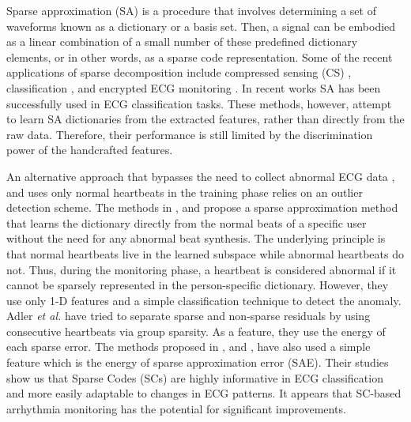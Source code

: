 \documentclass[journal,transmag]{IEEEtran}
\begin{document}
Sparse approximation (SA) is a procedure that involves determining a set of waveforms known as a dictionary or a basis set. Then, a signal can be embodied as a linear combination of a small number of these predefined dictionary elements, or in other words, as a sparse code representation.
Some of the recent applications of sparse decomposition include compressed sensing (CS) \cite{CS}, classification \cite{yamacc2021convolutional}, and encrypted ECG monitoring \cite{yamacECG}. In recent works \cite{huang2012sparse, mathews2015leveraging} SA has been successfully used in ECG classification tasks. These methods, however, attempt to learn SA dictionaries from the extracted features, rather than directly from the raw data. Therefore, their performance is still limited by the discrimination power of the handcrafted features.

An alternative approach that bypasses the need to collect abnormal ECG data  \cite{carrera2016ecg}, and uses only normal heartbeats in the training phase relies on an outlier detection scheme. The methods in \cite{carrera2016ecg}, and \cite{Elad} propose a sparse approximation method that learns the dictionary directly from the normal beats of a specific user without the need for any abnormal beat synthesis. The underlying principle is that normal heartbeats live in the learned subspace while abnormal heartbeats do not. Thus, during the monitoring phase, a heartbeat is considered abnormal if it cannot be sparsely represented in the person-specific dictionary. However, they use only 1-D features and a simple classification technique to detect the anomaly. Adler \textit{et al.} \cite{Elad} have tried to separate sparse and non-sparse residuals by using consecutive heartbeats via group sparsity. As a feature, they use the energy of each sparse error. The methods proposed in \cite{carrera2016ecg}, and \cite{carrera2019online}, have also used a simple feature which is the energy of sparse approximation error (SAE). Their studies show us that Sparse Codes (SCs) are highly informative in ECG classification and more easily adaptable to changes in ECG patterns. It appears that SC-based arrhythmia monitoring has the potential for significant improvements.
\end{document}
